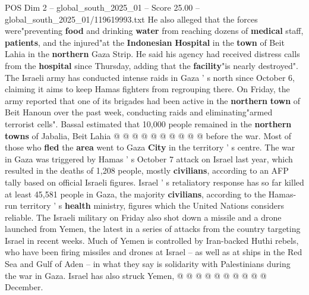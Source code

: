 \begin{textsample}{POS Dim 2 – global\_south\_2025\_01 – Score 25.00 – global\_south\_2025\_01/119619993.txt}
He also alleged that the forces were"preventing \textbf{food} and drinking \textbf{water} from reaching dozens of \textbf{medical} staff, \textbf{patients}, and the injured"at the \textbf{Indonesian} \textbf{Hospital} in the \textbf{town} of Beit Lahia in the \textbf{northern} Gaza Strip.
He said his agency had received distress calls from the \textbf{hospital} since Thursday, adding that the \textbf{facility}"is nearly destroyed".
The Israeli army has conducted intense raids in Gaza ' s north since October 6, claiming it aims to keep Hamas fighters from regrouping there.
On Friday, the army reported that one of its brigades had been active in the \textbf{northern} \textbf{town} of Beit Hanoun over the past week, conducting raids and eliminating"armed terrorist cells".
Bassal estimated that 10,000 people remained in the \textbf{northern} \textbf{towns} of Jabalia, Beit Lahia @ @ @ @ @ @ @ @ @ @ before the war.
Most of those who \textbf{fled} the \textbf{area} went to Gaza \textbf{City} in the territory ' s centre.
The war in Gaza was triggered by Hamas ' s October 7 attack on Israel last year, which resulted in the deaths of 1,208 people, mostly \textbf{civilians}, according to an AFP tally based on official Israeli figures.
Israel ' s retaliatory response has so far killed at least 45,581 people in Gaza, the majority \textbf{civilians}, according to the Hamas-run territory ' s \textbf{health} ministry, figures which the United Nations considers reliable.
The Israeli military on Friday also shot down a missile and a drone launched from Yemen, the latest in a series of attacks from the country targeting Israel in recent weeks.
Much of Yemen is controlled by Iran-backed Huthi rebels, who have been firing missiles and drones at Israel -- as well as at ships in the Red Sea and Gulf of Aden -- in what they say is solidarity with Palestinians during the war in Gaza.
Israel has also struck Yemen, @ @ @ @ @ @ @ @ @ @ December.

\end{textsample}
